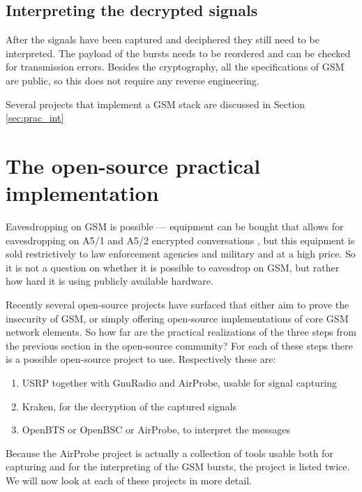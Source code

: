 \documentclass[a4paper,11pt]{llncs}
\begin{document}
\subsection{Interpreting the decrypted signals}\label{sec:th_int}
After the signals have been captured and deciphered they still need to be interpreted. The payload of the bursts needs to be reordered and can be checked for transmission errors. Besides the cryptography, all the specifications of GSM are public, so this does not require any reverse engineering.

Several projects that implement a GSM stack are discussed in Section \ref{sec:prac_int}

\section{The open-source practical implementation}\label{sec:prac}
Eavesdropping on GSM is possible --- equipment can be bought that allows for eavesdropping on A5/1 and A5/2 encrypted conversations \cite{url:eavesdropper}, but this equipment is sold restrictively to law enforcement agencies and military and at a high price. So it is not a question on whether it is possible to eavesdrop on GSM, but rather how hard it is using publicly available hardware.

Recently several open-source projects have surfaced that either aim to prove the insecurity of GSM, or simply offering open-source implementations of core GSM network elements.
So how far are the practical realizations of the three steps from the previous section in the open-source community? For each of these steps there is a possible open-source project to use. Respectively these are: 
\begin{enumerate}
\item \label{capi} USRP together with GnuRadio and AirProbe, usable for signal capturing
\item \label{deci} Kraken, for the decryption of the captured signals
\item \label{inti} OpenBTS or OpenBSC or AirProbe, to interpret the messages
\end{enumerate}
Because the AirProbe project is actually a collection of tools usable both for capturing and for the interpreting of the GSM bursts, the project is listed twice. We will now look at each of these projects in more detail.
\end{document}
